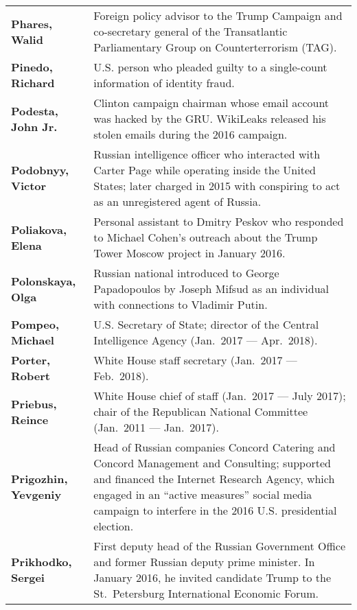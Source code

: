 \begin{longtable}{ p{} p{} }
    \textbf{Phares, Walid} & Foreign policy advisor to the Trump Campaign and co-secretary general of the Transatlantic Parliamentary Group on Counterterrorism (TAG). \\

    \textbf{Pinedo, Richard} & U.S. person who pleaded guilty to a single-count information of identity fraud. \\

    \textbf{Podesta, John Jr.} & Clinton campaign chairman whose email account was hacked by the GRU. WikiLeaks released his stolen emails during the 2016 campaign. \\

    \textbf{Podobnyy, Victor} & Russian intelligence officer who interacted with Carter Page while operating inside the United States; later charged in 2015 with conspiring to act as an unregistered agent of Russia. \\

    \textbf{Poliakova, Elena} & Personal assistant to Dmitry Peskov who responded to Michael Cohen’s outreach about the Trump Tower Moscow project in January 2016. \\

    \textbf{Polonskaya, Olga} & Russian national introduced to George Papadopoulos by Joseph Mifsud as an individual with connections to Vladimir Putin. \\

    \textbf{Pompeo, Michael} & U.S. Secretary of State; director of the Central Intelligence Agency (Jan.~2017 — Apr.~2018). \\

    \textbf{Porter, Robert} & White House staff secretary (Jan.~2017 — Feb.~2018). \\

    \textbf{Priebus, Reince} & White House chief of staff (Jan.~2017 — July 2017); chair of the Republican National Committee (Jan.~2011 — Jan.~2017). \\

    \textbf{Prigozhin, Yevgeniy} & Head of Russian companies Concord Catering and Concord Management and Consulting; supported and financed the Internet Research Agency, which engaged in an “active measures” social media campaign to interfere in the 2016 U.S. presidential election. \\

    \textbf{Prikhodko, Sergei} & First deputy head of the Russian Government Office and former Russian deputy prime minister. In January 2016, he invited candidate Trump to the St.~Petersburg International Economic Forum. \\


\end{longtable}
